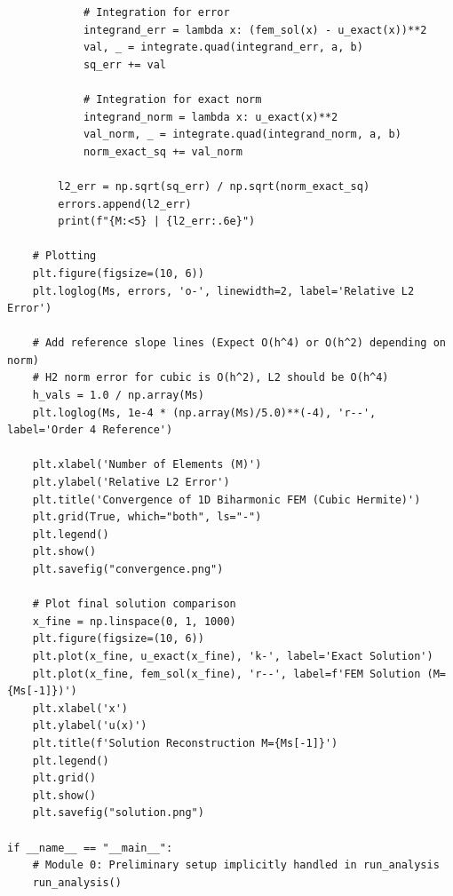 \documentclass{hw-template}
\begin{document}
\begin{verbatim}
            # Integration for error
            integrand_err = lambda x: (fem_sol(x) - u_exact(x))**2
            val, _ = integrate.quad(integrand_err, a, b)
            sq_err += val
            
            # Integration for exact norm
            integrand_norm = lambda x: u_exact(x)**2
            val_norm, _ = integrate.quad(integrand_norm, a, b)
            norm_exact_sq += val_norm
            
        l2_err = np.sqrt(sq_err) / np.sqrt(norm_exact_sq)
        errors.append(l2_err)
        print(f"{M:<5} | {l2_err:.6e}")

    # Plotting
    plt.figure(figsize=(10, 6))
    plt.loglog(Ms, errors, 'o-', linewidth=2, label='Relative L2 Error')
    
    # Add reference slope lines (Expect O(h^4) or O(h^2) depending on norm)
    # H2 norm error for cubic is O(h^2), L2 should be O(h^4)
    h_vals = 1.0 / np.array(Ms)
    plt.loglog(Ms, 1e-4 * (np.array(Ms)/5.0)**(-4), 'r--', label='Order 4 Reference')
    
    plt.xlabel('Number of Elements (M)')
    plt.ylabel('Relative L2 Error')
    plt.title('Convergence of 1D Biharmonic FEM (Cubic Hermite)')
    plt.grid(True, which="both", ls="-")
    plt.legend()
    plt.show()
    plt.savefig("convergence.png")
    
    # Plot final solution comparison
    x_fine = np.linspace(0, 1, 1000)
    plt.figure(figsize=(10, 6))
    plt.plot(x_fine, u_exact(x_fine), 'k-', label='Exact Solution')
    plt.plot(x_fine, fem_sol(x_fine), 'r--', label=f'FEM Solution (M={Ms[-1]})')
    plt.xlabel('x')
    plt.ylabel('u(x)')
    plt.title(f'Solution Reconstruction M={Ms[-1]}')
    plt.legend()
    plt.grid()
    plt.show()
    plt.savefig("solution.png")

if __name__ == "__main__":
    # Module 0: Preliminary setup implicitly handled in run_analysis
    run_analysis()
\end{verbatim}
\end{document}
